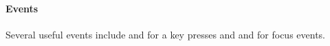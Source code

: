 \paragraph{Events}
Several useful events include  and  for a key presses and   and  for focus events.




